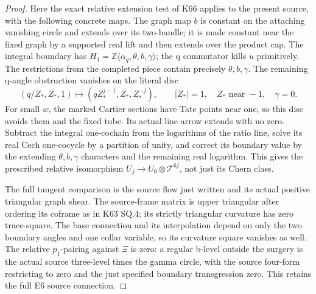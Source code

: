 \begin{proof}
Here the exact relative extension test of K66 applies to the
present source, with the following concrete maps. The graph map
\(b\) is constant on the attaching vanishing circle and extends
over its two-handle; it is made constant near the fixed graph by
a supported real lift and then extends over the product cap.
The integral boundary has
\(H_1=\mathbb Z\langle\alpha_q,\theta,b,\gamma\rangle\);
the q commutator kills \(u\) primitively. The restrictions from
the completed piece contain precisely \(\theta,b,\gamma\).
The remaining q-angle obstruction vanishes on the literal disc
\[
 (q/Z_*,Z_*,1)\mapsto(qZ_*^{j-1},Z_*,Z_*^{-j}),
 \qquad |Z_*|=1,\quad Z_*\text{ near }-1,\quad\gamma=0.
 \tag{EC.26c}
\]
For small \(w\), the marked Cartier sections have Tate points
near one, so this disc avoids them and the fixed tube. Its actual
line arrow extends with no zero. Subtract the integral one-cochain
from the logarithms of the ratio line, solve its real Cech
one-cocycle by a partition of unity, and correct its boundary value
by the extending \(\theta,b,\gamma\) characters and the remaining
real logarithm. This gives the prescribed relative isomorphism
\(U_j\to U_0\otimes\mathcal T^{6j}\), not just its Chern class.

The full tangent comparison is the source flow just written and
its actual positive triangular graph shear. The source-frame
matrix is upper triangular after ordering its coframe as in
K63 SQ.4; its strictly triangular curvature has zero trace-square.
The base connection and its interpolation depend on only the
two boundary angles and one collar variable, so its curvature
square vanishes as well. The relative \(p_1\)-pairing against
\(\Xi\) is zero: a regular b-level outside the surgery is the
actual source three-level times the gamma circle, with the source
four-form restricting to zero and the just specified boundary
transgression zero. This retains the full E6 source connection.


\end{proof}
